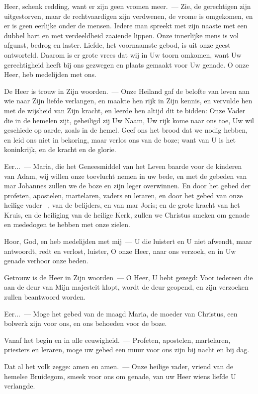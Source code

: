 \documentclass[12pt,twoside,a5paper]{article}
\begin{document}
\begin{halfparskip}
   Heer, schenk redding, want er zijn geen vromen meer.~--- Zie, de gerechtigen zijn uitgestorven, maar de rechtvaardigen zijn verdwenen, de vrome is omgekomen, en er is geen eerlijke onder de mensen. Iedere man spreekt met zijn naaste met een dubbel hart en met verdeeldheid zaaiende lippen. Onze innerlijke mens is vol afgunst, bedrog en laster. Liefde, het voornaamste gebod, is uit onze geest ontworteld. Daarom is er grote vrees dat wij in Uw toorn omkomen, want Uw gerechtigheid heeft bij ons gezwegen en plaats gemaakt voor Uw genade. O onze Heer, heb medelijden met ons.

  De Heer is trouw in Zijn woorden.~--- Onze Heiland gaf de belofte van leven aan wie naar Zijn liefde verlangen, en maakte hen rijk in Zijn kennis, en vervulde hen met de wijsheid van Zijn kracht, en leerde hen altijd dit te bidden: Onze Vader die in de hemelen zijt, geheiligd zij Uw Naam, Uw rijk kome naar ons toe, Uw wil geschiede op aarde, zoals in de hemel. Geef ons het brood dat we nodig hebben, en leid ons niet in bekoring, maar verlos ons van de boze; want van U is het koninkrijk, en de kracht en de glorie.

  Eer...~--- Maria, die het Geneesmiddel van het Leven baarde voor de kinderen van Adam, wij willen onze toevlucht nemen in uw bede, en met de gebeden van mar Johannes zullen we de boze en zijn leger overwinnen. En door het gebed der profeten, apostelen, martelaren, vaders en leraren, en door het gebed van onze heilige vader \NN~\liturgicalhint{[patroon]}, van de belijders, en van mar Joris; en de grote kracht van het Kruis, en de heiliging van de heilige Kerk, zullen we Christus smeken om genade en mededogen te hebben met onze zielen.
\end{halfparskip}

\begin{halfparskip}
   Hoor, God, en heb medelijden met mij~--- U die luistert en U niet afwendt, maar antwoordt, redt en verlost, luister, O onze Heer, naar ons verzoek, en in Uw genade verhoor onze beden.

  Getrouw is de Heer in Zijn woorden~--- O Heer, U hebt gezegd: Voor iedereen die aan de deur van Mijn majesteit klopt, wordt de deur geopend, en zijn verzoeken zullen beantwoord worden.

  Eer...~--- Moge het gebed van de maagd Maria, de moeder van Christus, een bolwerk zijn voor ons, en ons behoeden voor de boze.

  Vanaf het begin en in alle eeuwigheid.~--- Profeten, apostelen, martelaren, priesters en leraren, moge uw gebed een muur voor ons zijn bij nacht en bij dag.

  Dat al het volk zegge: amen en amen.~--- Onze heilige vader, vriend van de hemelse Bruidegom, smeek voor ons om genade, van uw Heer wiens liefde U verlangde.
\end{halfparskip}
\end{document}
